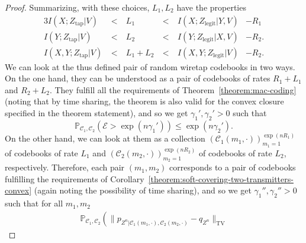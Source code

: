\documentclass[journal]{IEEEtran}
\newcommand{\channelpmf}{q}
\newcommand{\codebookpmf}{p}
\newcommand{\codebookRateOne}{R_1}
\newcommand{\codebookRateTwo}{R_2}
\newcommand{\channelInOne}{X}
\newcommand{\channelInTwo}{Y}
\newcommand{\channelOut}{Z}
\newcommand{\channelOutWiretapper}{\channelOut_\mathrm{tap}}
\newcommand{\channelOutLegit}{\channelOut_\mathrm{legit}}
\newcommand{\codebookOne}{\mathcal{C}_1}
\newcommand{\codebookTwo}{\mathcal{C}_2}
\newcommand{\codewordIndex}{m}
\newcommand{\codebookBlocklength}{n}
\newcommand{\mutualInformationConditional}[3]{I(#1;#2|#3)}
\newcommand{\finalconstOne}{\gamma_1}
\newcommand{\finalconstTwo}{\gamma_2}
\newcommand{\totalvariation}[1]{\lVert #1 \rVert_\mathrm{TV}}
\newcommand{\Probability}{\mathbb{P}}
\newcommand{\errorprob}{\mathcal{E}}
\newcommand{\codebookRandRateOne}{{L_1}}
\newcommand{\codebookRandRateTwo}{{L_2}}
\newcommand{\timeSharingRV}{V}
\begin{document}
\begin{proof}
Summarizing, with these choices, $\codebookRandRateOne, \codebookRandRateTwo$ have the properties
\begin{alignat*}{3}
\mutualInformationConditional{\channelInOne}{\channelOutWiretapper}{\timeSharingRV}
&~<~&
\codebookRandRateOne
&~<~&
\mutualInformationConditional{\channelInOne}{\channelOutLegit}{\channelInTwo, \timeSharingRV} &- \codebookRateOne
\\
\mutualInformationConditional{\channelInTwo}{\channelOutWiretapper}{\timeSharingRV}
&~<~&
\codebookRandRateTwo
&~<~&
\mutualInformationConditional{\channelInTwo}{\channelOutLegit}{\channelInOne,\timeSharingRV} &- \codebookRateTwo.
\\
\mutualInformationConditional{\channelInOne, \channelInTwo}{\channelOutWiretapper}{\timeSharingRV}
&~<~&
\codebookRandRateOne + \codebookRandRateTwo
&~<~&
\mutualInformationConditional{\channelInOne, \channelInTwo}{\channelOutLegit}{\timeSharingRV} &- \codebookRateTwo.
\end{alignat*}
We can look at the thus defined pair of random wiretap codebooks in two ways. On the one hand, they can be understood as a pair of codebooks of rates $\codebookRateOne + \codebookRandRateOne$ and $\codebookRateTwo + \codebookRandRateTwo$. They fulfill all the requirements of Theorem~\ref{theorem:mac-coding} (noting that by time sharing, the theorem is also valid for the convex closure specified in the theorem statement), and so we get $\finalconstOne', \finalconstTwo' > 0$ such that
\[
\Probability_{\codebookOne, \codebookTwo} (\errorprob > \exp(\codebookBlocklength\finalconstOne')) \leq \exp(\codebookBlocklength\finalconstTwo').
\]
On the other hand, we can look at them as a collection $(\codebookOne(\codewordIndex_1, \cdot))_{\codewordIndex_1=1}^{\exp(\codebookBlocklength\codebookRateOne)}$ of codebooks of rate $\codebookRandRateOne$ and $(\codebookTwo(\codewordIndex_2, \cdot))_{\codewordIndex_2=1}^{\exp(\codebookBlocklength\codebookRateTwo)}$ of codebooks of rate $\codebookRandRateTwo$, respectively. Therefore, each pair $(\codewordIndex_1, \codewordIndex_2)$ corresponds to a pair of codebooks fulfilling the requirements of Corollary~\ref{theorem:soft-covering-two-transmitters-convex} (again noting the possibility of time sharing), and so we get $\finalconstOne'', \finalconstTwo'' > 0$ such that for all $\codewordIndex_1, \codewordIndex_2$
\begin{multline*}
\Probability_{\codebookOne, \codebookTwo} \left(
  \totalvariation{
    \codebookpmf_{\channelOut^\codebookBlocklength | \codebookOne(\codewordIndex_1, \cdot), \codebookTwo(\codewordIndex_2, \cdot)} - \channelpmf_{\channelOut^\codebookBlocklength}
}
\end{multline*}
\end{proof}
\end{document}
